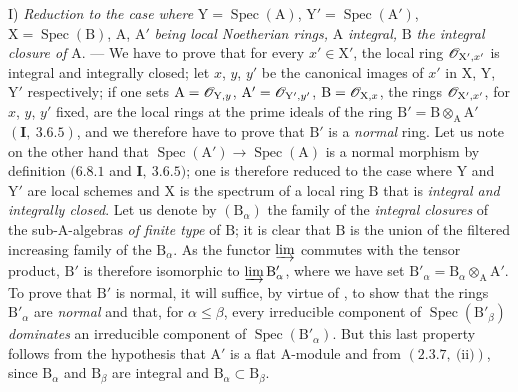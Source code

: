 I) \emph{Reduction to the case where} $\mathrm{Y}=\operatorname{Spec}(\mathrm{A})$, $\mathrm{Y}'=\operatorname{Spec}(\mathrm{A}')$, $\mathrm{X}=\operatorname{Spec}(\mathrm{B})$, $\mathrm{A}$, $\mathrm{A}'$ \emph{being
local Noetherian rings,} $\mathrm{A}$ \emph{integral,} $\mathrm{B}$ \emph{the integral closure of} $\mathrm{A}$. --- We have to prove that
for every $x'\in\mathrm{X}'$, the local ring $\mathscr{O}_{\mathrm{X}',x'}$ is integral and integrally closed; let $x$, $y$, $y'$
be the canonical images of $x'$ in $\mathrm{X}$, $\mathrm{Y}$, $\mathrm{Y}'$ respectively; if one sets $\mathrm{A}=\mathscr{O}_{\mathrm{Y},y}$,
$\mathrm{A}'=\mathscr{O}_{\mathrm{Y}',y'}$, $\mathrm{B}=\mathscr{O}_{\mathrm{X},x}$, the rings $\mathscr{O}_{\mathrm{X}',x'}$, for $x$, $y$, $y'$ fixed, are the local rings at the
prime ideals of the ring $\mathrm{B}'=\mathrm{B}\otimes_\mathrm{A}\mathrm{A}'$ $(\mathbf{I},~3.6.5)$, and we therefore have to prove that $\mathrm{B}'$
is a \emph{normal} ring. Let us note on the other hand that $\operatorname{Spec}(\mathrm{A}')\to\operatorname{Spec}(\mathrm{A})$ is a normal
morphism by definition $(6.8.1$ and $\mathbf{I},~3.6.5)$; one is therefore reduced to the case where $\mathrm{Y}$ and $\mathrm{Y}'$ are
local schemes and $\mathrm{X}$ is the spectrum of a local ring $\mathrm{B}$ that is \emph{integral and integrally closed}.
Let us denote by $(\mathrm{B}_\alpha)$ the family of the \emph{integral closures} of the sub-$\mathrm{A}$-algebras \emph{of finite type} of $\mathrm{B}$;
it is clear that $\mathrm{B}$ is the union of the filtered increasing family of the $\mathrm{B}_\alpha$. As the functor $\varinjlim$
commutes with the tensor product, $\mathrm{B}'$ is therefore isomorphic to $\varinjlim\mathrm{B}'_\alpha$, where we have set
$\mathrm{B}'_\alpha=\mathrm{B}_\alpha\otimes_\mathrm{A}\mathrm{A}'$. To prove that $\mathrm{B}'$ is normal, it will suffice, by virtue of , to
show that the rings $\mathrm{B}'_\alpha$ are \emph{normal} and that, for $\alpha\leqslant\beta$, every irreducible component
of $\operatorname{Spec}(\mathrm{B}'_\beta)$ \emph{dominates} an irreducible component of $\operatorname{Spec}(\mathrm{B}'_\alpha)$. But this
last property follows from the hypothesis that $\mathrm{A}'$ is a flat $\mathrm{A}$-module and from $(2.3.7,~\text{(ii)})$, since
$\mathrm{B}_\alpha$ and $\mathrm{B}_\beta$ are integral and $\mathrm{B}_\alpha\subset\mathrm{B}_\beta$.

